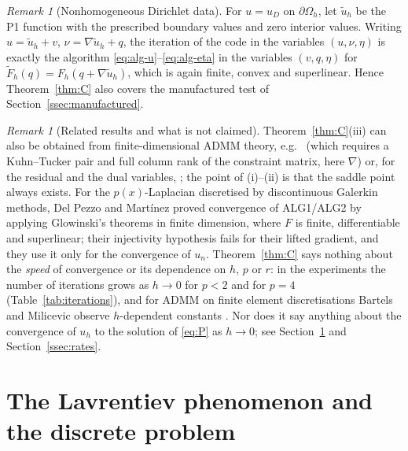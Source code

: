 \documentclass[11pt]{amsart}
\theoremstyle{definition}
\theoremstyle{remark}
\newtheorem{remark}[theorem]{Remark}
\numberwithin{equation}{section}
\begin{document}
\begin{remark}[Nonhomogeneous Dirichlet data]\label{rem:dirichlet}
For $u=u_D$ on $\partial\Omega_h$, let $\tilde u_h$ be the P1 function with the prescribed boundary values and zero interior values. Writing $u=\tilde u_h+v$, $\nu=\nabla\tilde u_h+q$, the iteration of the code in the variables $(u,\nu,\eta)$ is exactly the algorithm \eqref{eq:alg-u}--\eqref{eq:alg-eta} in the variables $(v,q,\eta)$ for $\tilde F_h(q)=F_h(q+\nabla\tilde u_h)$, which is again finite, convex and superlinear. Hence Theorem~\ref{thm:C} also covers the manufactured test of Section~\ref{ssec:manufactured}.
\end{remark}

\begin{remark}[Related results and what is not claimed]\label{rem:C-literature}
Theorem~\ref{thm:C}(iii) can also be obtained from finite-dimensional ADMM theory, e.g.\ \cite[Thm.~8]{EcksteinBertsekas1992} (which requires a Kuhn--Tucker pair and full column rank of the constraint matrix, here $\nabla$) or, for the residual and the dual variables, \cite[\S3.2]{Boyd2011ADMM}; the point of (i)--(ii) is that the saddle point always exists. For the $p(x)$-Laplacian discretised by discontinuous Galerkin methods, Del Pezzo and Mart\'inez \cite{DelPezzoMartinez2014DCM} proved convergence of ALG1/ALG2 by applying Glowinski's theorems in finite dimension, where $F$ is finite, differentiable and superlinear; their injectivity hypothesis fails for their lifted gradient, and they use it only for the convergence of $u_n$. Theorem~\ref{thm:C} says nothing about the \emph{speed} of convergence or its dependence on $h$, $p$ or $r$: in the experiments the number of iterations grows as $h\to0$ for $p<2$ and for $p=4$ (Table~\ref{tab:iterations}), and for ADMM on finite element discretisations Bartels and Milicevic observe $h$-dependent constants \cite{BartelsMilicevic2017}. Nor does it say anything about the convergence of $u_h$ to the solution of \eqref{eq:P} as $h\to0$; see Section~\ref{sec:lavrentiev} and Section~\ref{ssec:rates}.
\end{remark}

\section{The Lavrentiev phenomenon and the discrete problem}\label{sec:lavrentiev}
\end{document}
